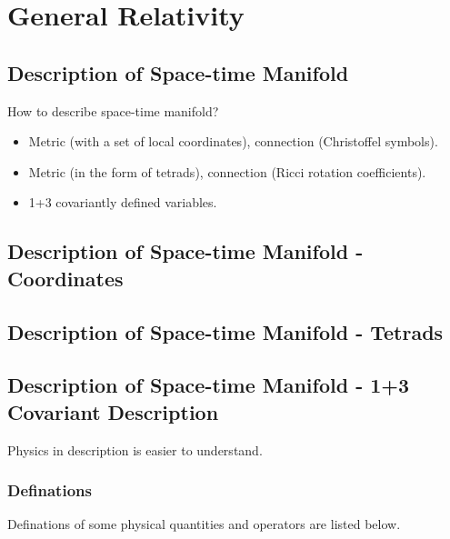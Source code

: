 \documentclass[letterpaper,10pt,english]{sphinxmanual}
\begin{document}
\section{General Relativity}
\label{relativity/GeneralRelativity::doc}\label{relativity/GeneralRelativity:general-relativity}

\subsection{Description of Space-time Manifold}
\label{relativity/GeneralRelativity:description-of-space-time-manifold}
How to describe space-time manifold?
\begin{itemize}
\item {} 
Metric (with a set of local coordinates), connection (Christoffel symbols).

\item {} 
Metric (in the form of tetrads), connection (Ricci rotation coefficients).

\item {} 
1+3 covariantly defined variables.

\end{itemize}


\subsection{Description of Space-time Manifold - Coordinates}
\label{relativity/GeneralRelativity:description-of-space-time-manifold-coordinates}

\subsection{Description of Space-time Manifold - Tetrads}
\label{relativity/GeneralRelativity:description-of-space-time-manifold-tetrads}

\subsection{Description of Space-time Manifold - 1+3 Covariant Description}
\label{relativity/GeneralRelativity:description-of-space-time-manifold-1-3-covariant-description}
Physics in description is easier to understand.


\subsubsection{Definations}
\label{relativity/GeneralRelativity:definations}
Definations of some physical quantities and operators are listed below.
\end{document}
